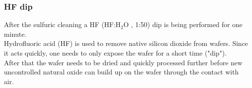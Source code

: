 \subsubsection{HF dip}
After the sulfuric cleaning a HF (HF:H$_2$O , 1:50) dip is being performed for one minute. \\
Hydrofluoric acid (HF) is used to remove native silicon dioxide from wafers. Since it acts quickly, one needs to only expose the wafer for a short time ("dip"). \\
After that the wafer needs to be dried and quickly processed further before new uncontrolled natural oxide can build up on the wafer through the contact with air.